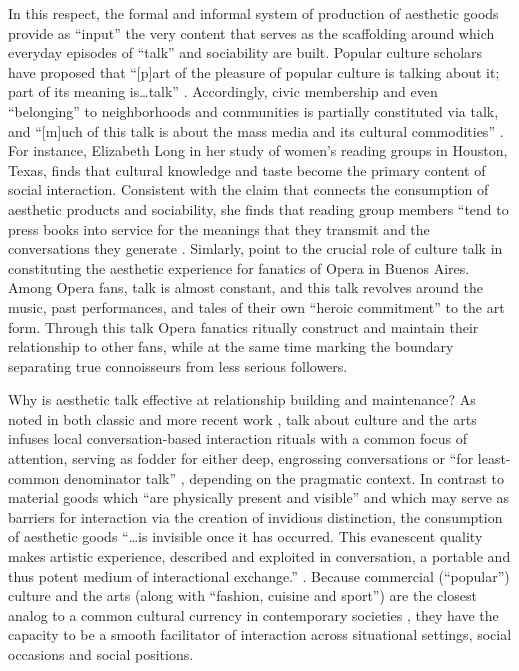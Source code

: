 In this respect, the formal and informal system of production of aesthetic goods provide as ``input'' the very content that serves as the scaffolding around which everyday episodes of ``talk'' and sociability are built.  Popular culture scholars have proposed that ``[p]art of the pleasure of popular culture is talking about it; part of its meaning is{\ldots}talk''  \citep[4]{frith98}. Accordingly, civic membership and even ``belonging'' to neighborhoods and communities is partially constituted via talk, and ``[m]uch of this talk is about the mass media and its cultural commodities'' \citep[73]{fiske87}. For instance, Elizabeth Long \citeyearpar{long03} in her study of women's reading groups in Houston, Texas, finds that cultural knowledge and taste become the primary content of social interaction. Consistent with the claim that connects the consumption of aesthetic products and sociability, she finds that reading group members ``tend to press books into service for the meanings that they transmit and the conversations they generate \citeyearpar[73]{long03}. Simlarly, \citet[316-317]{benzecry_collins14} point to the crucial role of culture talk in constituting the aesthetic experience for fanatics of Opera in Buenos Aires. Among Opera fans, talk is almost constant, and this talk revolves around the music, past performances, and tales of their own ``heroic commitment'' to the art form. Through this talk Opera fanatics ritually construct and maintain their relationship to other fans, while at the same time marking the boundary separating true connoisseurs from less serious followers. 

Why is aesthetic talk effective at relationship building and maintenance? As noted in both classic \citep{fine77, dimaggio87} and more recent work \citep{cardon_granjon05, lewis_etal12}, talk about culture and the arts infuses local conversation-based interaction rituals with a common focus of attention, serving as fodder for either deep, engrossing conversations \citep{frith98} or ``for least-common denominator talk'' \citep[443]{dimaggio87}, depending on the pragmatic context. In contrast to material goods which ``are physically present and visible'' and which may serve as barriers for interaction via the creation of invidious distinction, the consumption of aesthetic goods ``\ldots is invisible once it has occurred. This evanescent quality makes artistic experience, described and exploited in conversation, a portable and thus potent medium of interactional exchange.'' \citep[443-444]{dimaggio87}. Because commercial (``popular'') culture and the arts (along with ``fashion, cuisine and sport'') are the closest analog to a common cultural currency in contemporary societies \citep{dimaggio00a}, they have the capacity to be a smooth facilitator of interaction across situational settings, social occasions and social positions\citep{erickson96}. 

